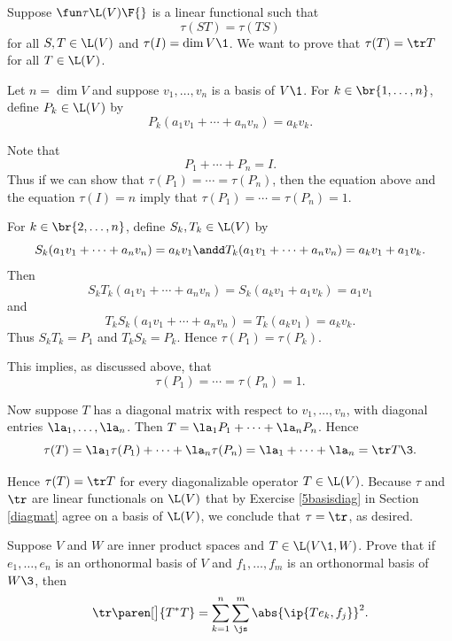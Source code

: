 \begin{Solution}
Suppose $\fun \tau {\L(V)} {\F{}}$ is a linear functional such that
\[
\tau(ST) = \tau(TS)
\]
for all $S, T \in \L(V)$ and $\tau(I) = \dim V\1$. We want to prove that $\tau(T) = \tr T$ for all $T \in \L(V)$.

Let $n = \dim V$ and suppose $v_1, \ldots, v_n$ is a basis of $V\1$. For $k \in \br{1, \ldots, n}$, define $P_k \in \L(V)$ by
\[
P_k(a_1 v_1 + \cdots + a_n v_n) = a_k v_k.
\]

Note that
\[
P_1 + \cdots + P_n  = I.
\]
Thus if we can show that $\tau(P_1) = \cdots = \tau(P_n)$, then the equation above and the equation $\tau(I) = n$ imply that
$\tau(P_1) = \cdots = \tau(P_n) = 1$.

For $k \in \br{2, \ldots, n}$, define $S_k, T_k \in \L(V)$ by
\[
S_k(a_1 v_1 + \cdots + a_n v_n) = a_k v_1 \andd T_k(a_1 v_1 + \cdots + a_n v_n) = a_k v_1 + a_1 v_k.
\]
Then
\[
S_k T_k(a_1 v_1 + \cdots + a_n v_n) = S_k( a_k v_1 + a_1 v_k ) = a_1 v_1
\]
and
\[
T_k S_k(a_1 v_1 + \cdots + a_n v_n) = T_k( a_k v_1 ) = a_k v_k.
\]
Thus $S_k T_k = P_1$ and $T_k S_k = P_k$. Hence $\tau(P_1) = \tau(P_k)$.

\pagebreak[3]

This implies, as discussed above, that
\[
\tau(P_1) = \cdots = \tau(P_n) = 1.
\]

Now suppose $T$ has a diagonal matrix with respect to $v_1, \ldots, v_n$, with diagonal entries $\la_1, \ldots, \la_n$. Then
$T = \la_1 P_1 + \cdots + \la_n P_n$. Hence
\[
\tau(T) = \la_1 \tau(P_1) + \cdots + \la_n \tau(P_n) = \la_1 + \cdots + \la_n = \tr T\3.
\]

Hence $\tau(T) = \tr T$ for every diagonalizable operator $T \in \L(V)$. Because $\tau$ and $\tr$ are linear functionals on $\L(V)$ that by Exercise \ref{5basisdiag} in Section \ref{diagmat} agree on a basis of $\L(V)$, we conclude that $\tau = \tr$, as desired.
\end{Solution}

\exercise
Suppose $V$ and $W$ are inner product spaces and $T \in \L(V\1,W)$.
Prove that if $e_1, \dots, e_n$ is an orthonormal basis of $V$ and $f_1, \ldots, f_m$ is an orthonormal basis of $W\3$, then
\[
\tr\paren[\big]{T^*T} = \sum_{k=1}^n \sum_{\js}^m \abs{ \ip{Te_k, f_j} }^2. \label{390}
\]


